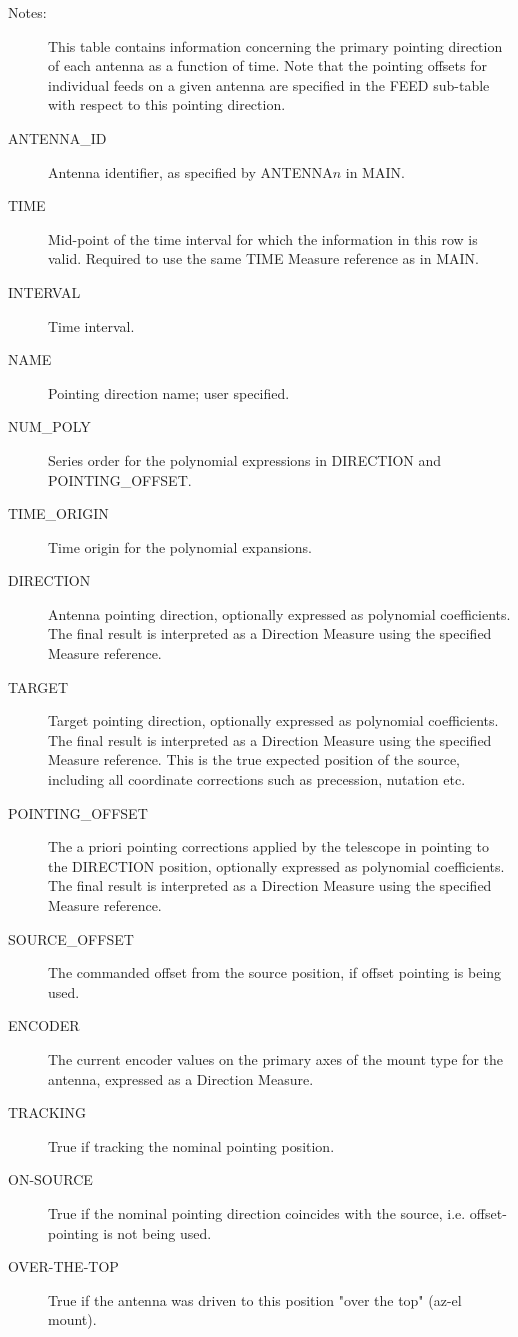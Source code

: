 \documentclass{article}
\begin{document}
\begin{description}

\item[Notes:] This table contains information concerning the primary
pointing direction of each antenna as a function of time. Note that
the pointing offsets for individual feeds on a given antenna are
specified in the FEED sub-table with respect to this pointing direction.

\item[ANTENNA\_ID] Antenna identifier, as specified by ANTENNA$n$ in MAIN.

\item[TIME] Mid-point of the time interval for which the information
in this row is valid. Required to use the same TIME Measure reference
as in MAIN.

\item[INTERVAL] Time interval.

\item[NAME] Pointing direction name; user specified.

\item[NUM\_POLY] Series order for the polynomial expressions in
DIRECTION and POINTING\_OFFSET.

\item[TIME\_ORIGIN] Time origin for the polynomial expansions.

\item[DIRECTION] Antenna pointing direction, optionally expressed as
polynomial coefficients. The final result is interpreted as a
Direction Measure using the specified Measure reference. 

\item[TARGET] Target pointing direction, optionally expressed as
polynomial coefficients. The final result is interpreted as a
Direction Measure using the specified Measure reference. This is the
true expected position of the source, including all coordinate
corrections such as precession, nutation etc.

\item[POINTING\_OFFSET] The a priori pointing corrections applied by
the telescope in pointing to the DIRECTION position, optionally
expressed as polynomial coefficients. The final result is interpreted
as a Direction Measure using the specified Measure reference.

\item[SOURCE\_OFFSET] The commanded offset from the source position,
if offset pointing is being used.

\item[ENCODER] The current encoder values on the primary axes of the
mount type for the antenna, expressed as a Direction Measure.

\item[TRACKING] True if tracking the nominal pointing position.

\item[ON-SOURCE] True if the nominal pointing direction coincides with
the source, i.e. offset-pointing is not being used.

\item[OVER-THE-TOP] True if the antenna was driven to this position
"over the top" (az-el mount).
\end{description}
\end{document}
